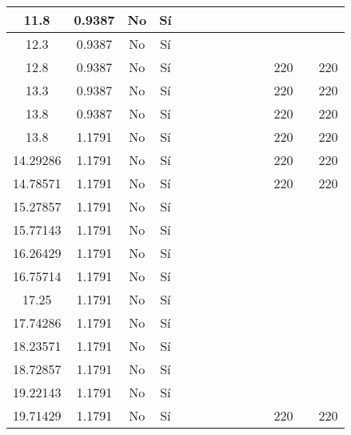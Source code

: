 \begin{table}[H]
{\begin{tabular}{|c|c|c|c|c|c|c|c|c|c|c|c|c|c|}
\hline
11.8 & 0.9387 & No  & Sí  &     &     &     &     &     &     &     &     &     &  \bigstrut\\
\hline
12.3 & 0.9387 & No  & Sí  &     &     &     &     &     &     &     &     &     &  \bigstrut\\
\hline
12.8 & 0.9387 & No  & Sí  &     &     &     &     &     &     &     & 220 &     & 220 \bigstrut\\
\hline
13.3 & 0.9387 & No  & Sí  &     &     &     &     &     &     &     & 220 &     & 220 \bigstrut\\
\hline
13.8 & 0.9387 & No  & Sí  &     &     &     &     &     &     &     & 220 &     & 220 \bigstrut\\
\hline
13.8 & 1.1791 & No  & Sí  &     &     &     &     &     &     &     & 220 &     & 220 \bigstrut\\
\hline
14.29286 & 1.1791 & No  & Sí  &     &     &     &     &     &     &     & 220 &     & 220 \bigstrut\\
\hline
14.78571 & 1.1791 & No  & Sí  &     &     &     &     &     &     &     & 220 &     & 220 \bigstrut\\
\hline
15.27857 & 1.1791 & No  & Sí  &     &     &     &     &     &     &     &     &     &  \bigstrut\\
\hline
15.77143 & 1.1791 & No  & Sí  &     &     &     &     &     &     &     &     &     &  \bigstrut\\
\hline
16.26429 & 1.1791 & No  & Sí  &     &     &     &     &     &     &     &     &     &  \bigstrut\\
\hline
16.75714 & 1.1791 & No  & Sí  &     &     &     &     &     &     &     &     &     &  \bigstrut\\
\hline
17.25 & 1.1791 & No  & Sí  &     &     &     &     &     &     &     &     &     &  \bigstrut\\
\hline
17.74286 & 1.1791 & No  & Sí  &     &     &     &     &     &     &     &     &     &  \bigstrut\\
\hline
18.23571 & 1.1791 & No  & Sí  &     &     &     &     &     &     &     &     &     &  \bigstrut\\
\hline
18.72857 & 1.1791 & No  & Sí  &     &     &     &     &     &     &     &     &     &  \bigstrut\\
\hline
19.22143 & 1.1791 & No  & Sí  &     &     &     &     &     &     &     &     &     &  \bigstrut\\
\hline
19.71429 & 1.1791 & No  & Sí  &     &     &     &     &     &     &     & 220 &     & 220 \bigstrut\\

\end{tabular}}
\end{table}
